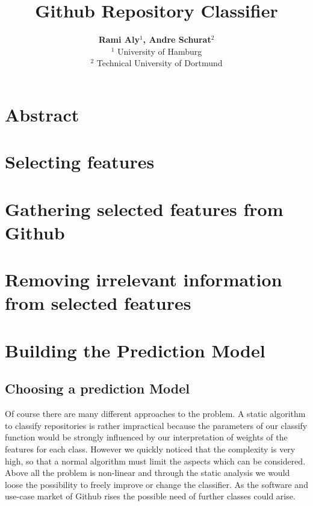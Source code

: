 \documentclass[paper=A4,pagesize=auto,13pt,headinclude=true,footinclude=true,BCOR=0mm,DIV=calc]{scrartcl}
\begin{document}
	
	\title{Github Repository Classifier}
	\author{\textbf{Rami Aly$^{1}$, Andre Schurat}$^{2}$\\
		$^{1}$ University of Hamburg\\
		$^{2}$ Technical University of Dortmund}
	\maketitle
	
	\newpage
	
	\section{Abstract}
	
	
	\newpage
	
	\tableofcontents 
	
	\newpage
	\section{Selecting features} 
	
	
	\section{Gathering selected features from Github}
	
	
	
	\section{Removing irrelevant information from selected features}

	
	
	\section{Building the Prediction Model}
	
	\subsection{Choosing a prediction Model}
	Of course there are many different approaches to the problem. A static algorithm to classify repositories is rather impractical because the parameters of our classify function would be strongly influenced by our interpretation of weights of the features for each class. However we quickly noticed that the complexity is very high, so that a normal algorithm must limit the aspects which can be considered. Above all the problem is non-linear and through the static analysis we would loose the possibility to freely improve or change the classifier. As the software and use-case market of Github rises the possible need of further classes could arise.
	
\end{document}

